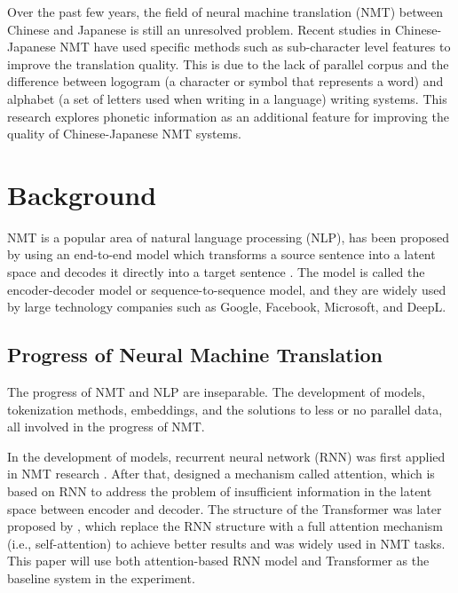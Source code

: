 \hspace{24pt}

Over the past few years, the field of neural machine translation (NMT) between Chinese and Japanese is still an unresolved problem. Recent studies in Chinese-Japanese NMT have used specific methods such as sub-character level features to improve the translation quality. This is due to the lack of parallel corpus and the difference between logogram (a character or symbol that represents a word) and alphabet (a set of letters used when writing in a language) writing systems. This research explores phonetic information as an additional feature for improving the quality of Chinese-Japanese NMT systems.

\section{Background} \label{sec:background}

NMT is a popular area of natural language processing (NLP), has been proposed by using an end-to-end model which transforms a source sentence into a latent space and decodes it directly into a target sentence \cite{sutskever2014sequence, cho2014learning}. The model is called the encoder-decoder model or sequence-to-sequence model, and they are widely used by large technology companies such as Google, Facebook, Microsoft, and DeepL.

\subsection{Progress of Neural Machine Translation} \label{sec:nmt}

The progress of NMT and NLP are inseparable. The development of models, tokenization methods, embeddings, and the solutions to less or no parallel data, all involved in the progress of NMT.

In the development of models, recurrent neural network (RNN) was first applied in NMT research \cite{sutskever2014sequence, cho2014learning}. After that, \cite{bahdanau2014neural} designed a mechanism called attention, which is based on RNN to address the problem of insufficient information in the latent space between encoder and decoder. The structure of the Transformer was later proposed by \cite{NIPS2017_3f5ee243}, which replace the RNN structure with a full attention mechanism (i.e., self-attention) to achieve better results and was widely used in NMT tasks. This paper will use both attention-based RNN model and Transformer \cite{bahdanau2014neural,NIPS2017_3f5ee243} as the baseline system in the experiment.

